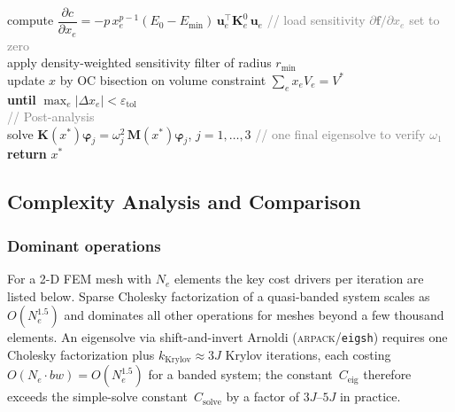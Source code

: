 \documentclass[12pt,a4paper]{article}
\newcommand{\kw}[1]{\textbf{#1}}          %
\newcommand{\var}[1]{\textit{#1}}         %
\newcommand{\cm}[1]{\textcolor{gray}{#1}} %
\newcommand{\ind}{\hspace*{1.4em}}        %
\begin{document}
\begin{algobox}
\ind compute
  $\dfrac{\partial c}{\partial x_e}
  = -p\,x_e^{p-1}(E_0-E_{\min})\,\mathbf{u}_e^{\top}\mathbf{K}_e^0\,\mathbf{u}_e$
  \quad\cm{// load sensitivity $\partial\mathbf{f}/\partial x_e$ set to zero}\\
\ind apply density-weighted sensitivity filter of radius $r_{\min}$\\
\ind update $x$ by OC bisection on volume constraint
  $\sum_e x_e V_e = V^*$\\
\kw{until} $\max_e|\Delta x_e| < \varepsilon_{\mathrm{tol}}$\\[4pt]
%
\cm{// Post-analysis}\\
solve $\mathbf{K}(\var{x}^*)\boldsymbol{\varphi}_j
      = \omega_j^2\,\mathbf{M}(\var{x}^*)\boldsymbol{\varphi}_j$,
  \;$j=1,\ldots,3$
  \quad\cm{// one final eigensolve to verify $\omega_1$}\\[4pt]
\kw{return} $x^*$
\end{algobox}

\subsection{Complexity Analysis and Comparison}
\label{subsec:complexity}

\subsubsection*{Dominant operations}

For a 2-D FEM mesh with $N_e$ elements the key cost drivers per
iteration are listed below.
Sparse Cholesky factorization of a quasi-banded system scales as
$O(N_e^{1.5})$ and dominates all other operations for meshes beyond
a few thousand elements.
An eigensolve via shift-and-invert Arnoldi
(\textsc{arpack}/\texttt{eigsh}) requires one Cholesky factorization
plus $k_{\mathrm{Krylov}} \approx 3J$ Krylov iterations, each costing
$O(N_e \cdot bw) = O(N_e^{1.5})$ for a banded system; the
constant~$C_{\mathrm{eig}}$ therefore exceeds the simple-solve
constant~$C_{\mathrm{solve}}$ by a factor of $3J$--$5J$ in practice.
\end{document}
